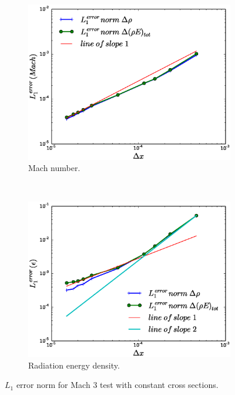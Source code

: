 \documentclass[times,doublespace]{fldauth}%
\begin{document}
\begin{figure}[ht]
    \begin{subfigure}{0.5\textwidth}
    \centering
    \includegraphics[width=\linewidth]{figures/cst-xs/mach-3/mass-energy-diff-scd-method-mach-number-convergence.eps}
    \caption{Mach number.}\label{fig:mach-3-cst-xs-mach-conv}
    \end{subfigure}
    ~
    \begin{subfigure}{0.5\textwidth}
    \centering
    \includegraphics[width=\linewidth]{figures/cst-xs/mach-3/mass-energy-diff-scd-method-radiation-convergence.eps}
    \caption{Radiation energy density.}\label{fig:mach-3-cst-xs-radiation-conv}
    \end{subfigure}        
\caption{$L_1$ error norm for Mach $3$ test with constant cross sections.}\label{fig:mach-3-cst-xs-conv}    
\end{figure}
%
\end{document}
